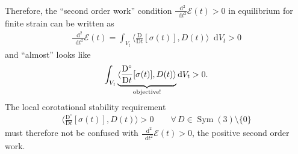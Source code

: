 \documentclass[10pt]{article}
\numberwithin{theoremCounter}{section}
\theoremstyle{plain}
\theoremstyle{definition}
\newcommand{\DD}{\mathrm{D}}
\newcommand*\dif{\mathop{}\!\mathrm{d}}
\DeclareMathOperator{\Sym}{Sym}
\numberwithin{equation}{section}
\begin{document}
\begin{appendix}
\begin{align*}
	\end{align*}
Therefore, the ``second order work'' condition $\frac{\dif^2}{\dif t^2} \mathcal{E}(t) > 0$ in equilibrium for finite strain can be written as
	\begin{align}
	\frac{\dif^2}{\dif t^2} \mathcal{E}(t) = \int_{V_t} \langle \frac{\DD}{\DD t} [\sigma(t)], D(t) \rangle \dif V_t > 0
	\end{align}
and ``almost'' looks like
	\begin{align}
	\int_{V_t} \underbrace{\langle \frac{\DD^{\circ}}{\DD t}[\sigma(t)], D(t) \rangle}_{\textnormal{objective!}} \dif V_t > 0.
	\end{align}
The local corotational stability requirement
	\begin{align}
	\langle \frac{\DD^{\circ}}{\DD t}[\sigma(t)], D(t) \rangle > 0 \qquad \forall \, D \in \Sym(3) \setminus \{0\}
	\end{align}
must therefore not be confused with $\frac{\dif^2}{\dif t^2} \mathcal{E}(t) > 0$, the positive second order work.
%

\end{appendix}
\end{document}
